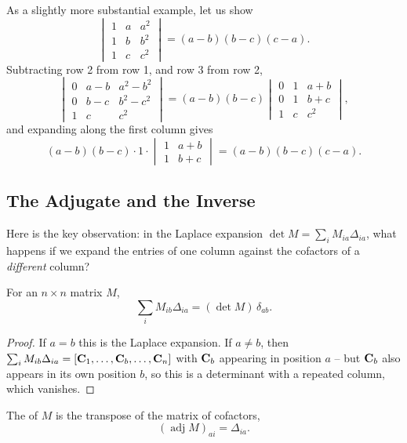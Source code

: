 \documentclass[a4paper]{scrartcl}
\newcommand{\adj}{\operatorname{adj}}
\begin{document}
\begin{example}
	As a slightly more substantial example, let us show
	$$
	\begin{vmatrix}
		1 & a & a^2 \\
		1 & b & b^2 \\
		1 & c & c^2
	\end{vmatrix} = (a - b)(b-c)(c-a).
	$$
	Subtracting row 2 from row 1, and row 3 from row 2,
	$$
	\begin{vmatrix}
		0 & a - b & a^2 - b^2 \\
		0 & b - c & b^2 - c^2 \\
		1 & c & c^2
	\end{vmatrix}
	= (a-b)(b-c)\begin{vmatrix}
		0 & 1 & a + b \\
		0 & 1 & b + c \\
		1 & c & c^2
	\end{vmatrix},
	$$
	and expanding along the first column gives
	$$
	(a-b)(b-c) \cdot 1 \cdot \begin{vmatrix}
		1 & a + b\\
		1 & b + c
	\end{vmatrix} = (a - b)(b - c)(c - a).
	$$
\end{example}

\subsection{The Adjugate and the Inverse}

Here is the key observation: in the Laplace expansion $\det M = \sum_i M_{ia}\Delta_{ia}$, what happens if we expand the entries of one column against the cofactors of a \emph{different} column?

\begin{lemma}\label{lemma:cofactor}
	For an $n \times n$ matrix $M$,
	$$
	\sum_{i} M_{ib} \Delta_{ia} = (\det M) \, \delta_{ab}.
	$$
\end{lemma}
\begin{proof}
	If $a = b$ this is the Laplace expansion. If $a \neq b$, then $\sum_i M_{ib}\Delta_{ia} = [\mathbf{C}_1, \dots, \mathbf{C}_b, \dots, \mathbf{C}_n]$ with $\mathbf{C}_b$ appearing in position $a$ -- but $\mathbf{C}_b$ also appears in its own position $b$, so this is a determinant with a repeated column, which vanishes.
\end{proof}

\begin{definition}[Adjugate]
	The  of $M$ is the transpose of the matrix of cofactors,
	$$
	(\adj M)_{ai} = \Delta_{ia}.
	$$
\end{definition}
\end{document}
